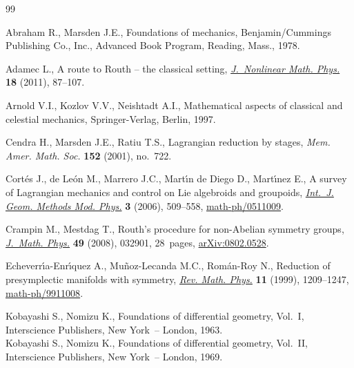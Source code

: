 \documentclass[pdftex]{sigma}
\begin{document}
\begin{thebibliography}{99}

\footnotesize\itemsep=0pt

Abraham R., Marsden J.E.,
Foundations of mechanics,
Benjamin/Cummings Publishing Co., Inc., Advanced Book Program, Reading, Mass., 1978.

Adamec L.,
A route to Routh -- the classical setting,
\href{http://dx.doi.org/10.1142/S1402925111001180}{{\em J.~Nonlinear Math. Phys.}} {\bf 18} (2011), 87--107.

 Arnold V.I., Kozlov V.V.,   Neishtadt A.I.,
Mathematical aspects of classical and celestial mechanics,
Springer-Verlag, Berlin, 1997.

Cendra H., Marsden J.E.,  Ratiu  T.S.,
Lagrangian reduction by stages,
{\it Mem. Amer. Math. Soc.} {\bf 152} (2001), no.~722.

Cort\'es J., de Le\'on M., Marrero J.C., Mart\'{\i}n de Diego D., Mart\'{\i}nez E.,
A survey of Lagrangian mecha\-nics and control on Lie algebroids and  groupoids,
\href{http://dx.doi.org/10.1142/S0219887806001211}{{\em  Int.~J. Geom. Methods Mod. Phys.}} {\bf 3} (2006), 509--558,
\href{http://arxiv.org/abs/math-ph/0511009}{math-ph/0511009}.

Crampin M., Mestdag T.,
Routh's procedure for non-Abelian symmetry groups,
\href{http://dx.doi.org/10.1063/1.2885077}{{\em J.~Math. Phys.}} {\bf 49} (2008), 032901, 28~pages,
\href{http://arxiv.org/abs/0802.0528}{arXiv:0802.0528}.

Echeverr{\'{\i}}a-Enr{\'{\i}}quez A., Mu{\~n}oz-Lecanda M.C.,  Rom{\'a}n-Roy N.,
Reduction of presymplectic manifolds with symmetry,
\href{http://dx.doi.org/10.1142/S0129055X99000386}{{\em Rev. Math. Phys.}} {\bf 11} (1999), 1209--1247,
\href{http://arxiv.org/abs/math-ph/9911008}{math-ph/9911008}.

Kobayashi S., Nomizu K.,
Foundations of dif\/ferential geometry, Vol.~I,
Interscience Publishers, New York~-- London, 1963.\\
Kobayashi S., Nomizu K.,
Foundations of dif\/ferential geometry, Vol.~II,
Interscience Publishers, New York~-- London, 1969.


\end{thebibliography}
\end{document}
